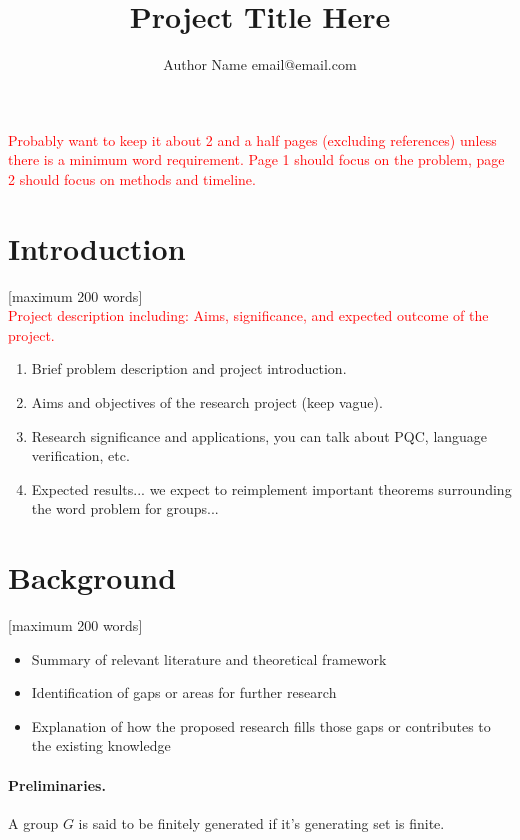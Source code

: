 \documentclass[12pt]{article}
\title{
  Project Title Here
}
\author{
  Author Name \large{email@email.com}
}
\begin{document}
\maketitle

\textcolor{red}{Probably want to keep it about 2 and a half pages (excluding references) unless there is a minimum word requirement. Page 1 should focus on the problem, page 2 should focus on methods and timeline.}

\section{Introduction}\label{sec:intro}
[maximum 200 words] \\

\noindent \textcolor{red}{Project description including: Aims, significance, and expected outcome of the project.}

\begin{enumerate}
  \item Brief problem description and project introduction.
  \item Aims and objectives of the research project (keep vague).
  \item Research significance and applications, you can talk about PQC, language verification, etc.
  \item Expected results... we expect to reimplement important theorems surrounding the word problem for groups...
\end{enumerate}

\section{Background}\label{sec:background}
[maximum 200 words] \\

\begin{itemize}
    \item Summary of relevant literature and theoretical framework
    \item Identification of gaps or areas for further research
    \item Explanation of how the proposed research fills those gaps or contributes to the existing knowledge
\end{itemize}

\paragraph{Preliminaries.} A group $G$ is said to be finitely generated if it's generating set is finite.
\end{document}
